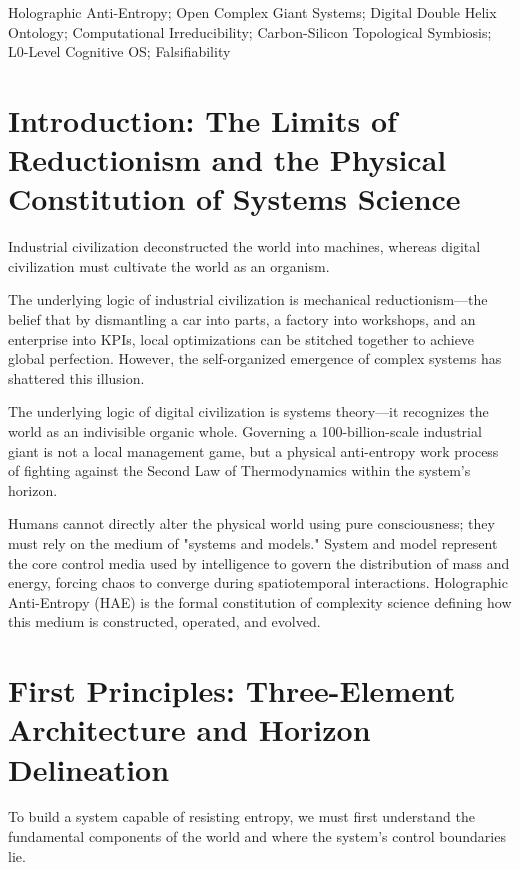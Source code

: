 \documentclass{article}
\begin{document}
\begin{keywords}
Holographic Anti-Entropy; Open Complex Giant Systems; Digital Double Helix Ontology; Computational Irreducibility; Carbon-Silicon Topological Symbiosis; L0-Level Cognitive OS; Falsifiability
\end{keywords}

\section{Introduction: The Limits of Reductionism and the Physical Constitution of Systems Science}
\label{intro}

Industrial civilization deconstructed the world into machines, whereas digital civilization must cultivate the world as an organism.

The underlying logic of industrial civilization is mechanical reductionism—the belief that by dismantling a car into parts, a factory into workshops, and an enterprise into KPIs, local optimizations can be stitched together to achieve global perfection. However, the self-organized emergence of complex systems has shattered this illusion.

The underlying logic of digital civilization is systems theory—it recognizes the world as an indivisible organic whole. Governing a 100-billion-scale industrial giant is not a local management game, but a physical anti-entropy work process of fighting against the Second Law of Thermodynamics within the system's horizon.

Humans cannot directly alter the physical world using pure consciousness; they must rely on the medium of "systems and models." System and model represent the core control media used by intelligence to govern the distribution of mass and energy, forcing chaos to converge during spatiotemporal interactions. Holographic Anti-Entropy (HAE) is the formal constitution of complexity science defining how this medium is constructed, operated, and evolved.

\section{First Principles: Three-Element Architecture and Horizon Delineation}
\label{sec:first-principles}

To build a system capable of resisting entropy, we must first understand the fundamental components of the world and where the system's control boundaries lie.
\end{document}
